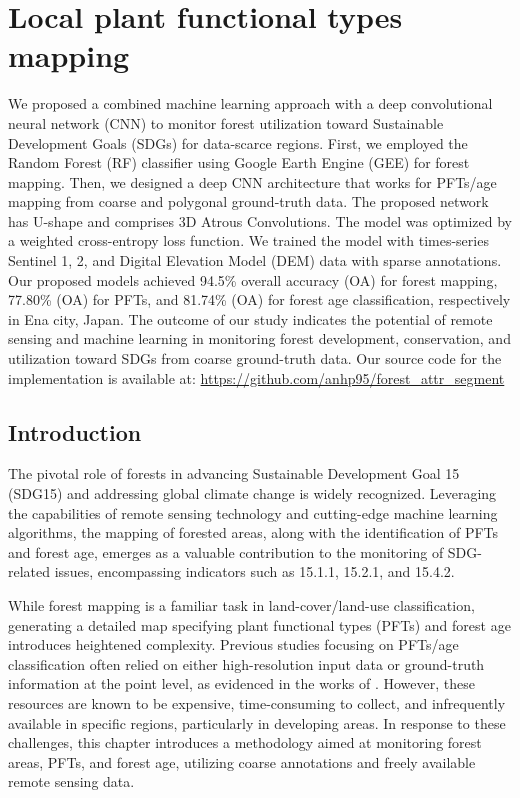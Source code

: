 \section{Local plant functional types mapping} \label{chap4_s1}
We proposed a combined machine learning approach with a deep convolutional neural network (CNN) to monitor forest utilization toward Sustainable Development Goals (SDGs) for data-scarce regions. First, we employed the Random Forest (RF) classifier using Google Earth Engine (GEE) for forest mapping. Then, we designed a deep CNN architecture that works for PFTs/age mapping from coarse and polygonal ground-truth data. The proposed network has U-shape and comprises 3D Atrous Convolutions. The model was optimized by a weighted cross-entropy loss function. We trained the model with times-series Sentinel 1, 2, and Digital Elevation Model (DEM) data with sparse annotations. Our proposed models achieved 94.5\% overall accuracy (OA) for forest mapping, 77.80\% (OA) for PFTs, and 81.74\% (OA) for forest age classification, respectively in Ena city, Japan. The outcome of our study indicates the potential of remote sensing and machine learning in monitoring forest development, conservation, and utilization toward SDGs from coarse ground-truth data. Our source code for the implementation is available at: \url{https://github.com/anhp95/forest_attr_segment}

\subsection{Introduction}
The pivotal role of forests in advancing Sustainable Development Goal 15 (SDG15) and addressing global climate change is widely recognized. Leveraging the capabilities of remote sensing technology and cutting-edge machine learning algorithms, the mapping of forested areas, along with the identification of PFTs and forest age, emerges as a valuable contribution to the monitoring of SDG-related issues, encompassing indicators such as 15.1.1, 15.2.1, and 15.4.2. \par

While forest mapping is a familiar task in land-cover/land-use classification, generating a detailed map specifying plant functional types (PFTs) and forest age introduces heightened complexity. Previous studies focusing on PFTs/age classification often relied on either high-resolution input data or ground-truth information at the point level, as evidenced in the works of \citep{schiefer2020mapping,la2021multi, lee2016individual}. However, these resources are known to be expensive, time-consuming to collect, and infrequently available in specific regions, particularly in developing areas. In response to these challenges, this chapter introduces a methodology aimed at monitoring forest areas, PFTs, and forest age, utilizing coarse annotations and freely available remote sensing data. \par

